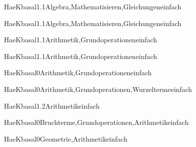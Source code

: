 \documentclass[12pt]{article}
\begin{document}
\begin{Add}{HaeK}{basal1.1}{Algebra,Mathematisieren,Gleichungen}{einfach}
\end{Add}

\begin{Add}{HaeK}{basal1.1}{Algebra,Mathematisieren,Gleichungen}{einfach}
\end{Add}

\begin{Add}{HaeK}{basal1.1}{Arithmetik,Grundoperationen}{einfach}
\end{Add}

\begin{Add}{HaeK}{basal1.1}{Arithmetik,Grundoperationen}{einfach}
\end{Add}

\begin{Add}{HaeK}{basal0}{Arithmetik,Grundoperationen}{einfach}
\end{Add}

\begin{Add}{HaeK}{basal0}{Arithmetik,Grundoperationen,Wurzelterme}{einfach}
\end{Add}

\begin{Add}{HaeK}{basal1.2}{Arithmetik}{einfach}
\end{Add}

\begin{Add}{HaeK}{basal0}{Bruchterme,Grundoperationen,Arithmetik}{einfach}
\end{Add}

\begin{Add}{HaeK}{basal0}{Geometrie,Arithmetik}{einfach}
\end{Add}
\end{document}
